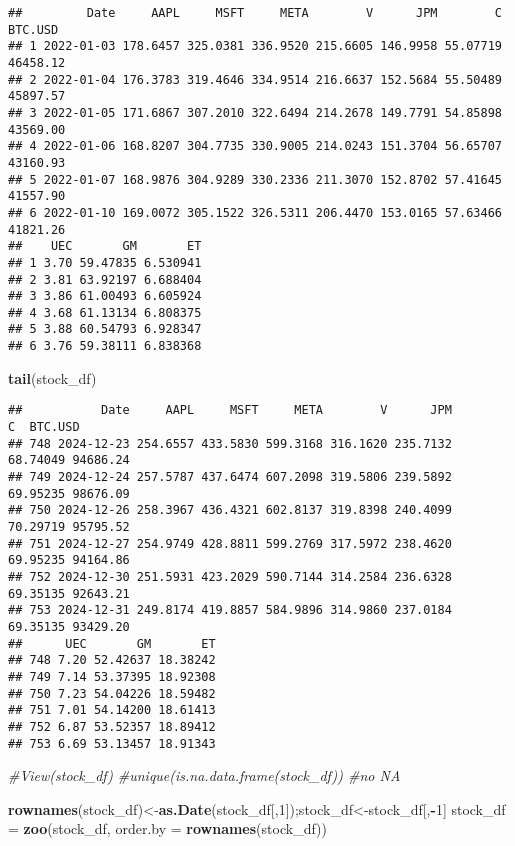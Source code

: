 \documentclass[
]{article}
\newenvironment{Shaded}{\begin{snugshade}}{\end{snugshade}}
\newcommand{\AttributeTok}[1]{\textcolor[rgb]{0.13,0.29,0.53}{#1}}
\newcommand{\CommentTok}[1]{\textcolor[rgb]{0.56,0.35,0.01}{\textit{#1}}}
\newcommand{\DecValTok}[1]{\textcolor[rgb]{0.00,0.00,0.81}{#1}}
\newcommand{\FunctionTok}[1]{\textcolor[rgb]{0.13,0.29,0.53}{\textbf{#1}}}
\newcommand{\NormalTok}[1]{#1}
\newcommand{\OtherTok}[1]{\textcolor[rgb]{0.56,0.35,0.01}{#1}}
\newcommand{\SpecialCharTok}[1]{\textcolor[rgb]{0.81,0.36,0.00}{\textbf{#1}}}
\begin{document}
\begin{verbatim}
##         Date     AAPL     MSFT     META        V      JPM        C  BTC.USD
## 1 2022-01-03 178.6457 325.0381 336.9520 215.6605 146.9958 55.07719 46458.12
## 2 2022-01-04 176.3783 319.4646 334.9514 216.6637 152.5684 55.50489 45897.57
## 3 2022-01-05 171.6867 307.2010 322.6494 214.2678 149.7791 54.85898 43569.00
## 4 2022-01-06 168.8207 304.7735 330.9005 214.0243 151.3704 56.65707 43160.93
## 5 2022-01-07 168.9876 304.9289 330.2336 211.3070 152.8702 57.41645 41557.90
## 6 2022-01-10 169.0072 305.1522 326.5311 206.4470 153.0165 57.63466 41821.26
##    UEC       GM       ET
## 1 3.70 59.47835 6.530941
## 2 3.81 63.92197 6.688404
## 3 3.86 61.00493 6.605924
## 4 3.68 61.13134 6.808375
## 5 3.88 60.54793 6.928347
## 6 3.76 59.38111 6.838368
\end{verbatim}

\begin{Shaded}
\begin{Highlighting}[]
\FunctionTok{tail}\NormalTok{(stock\_df)}
\end{Highlighting}
\end{Shaded}

\begin{verbatim}
##           Date     AAPL     MSFT     META        V      JPM        C  BTC.USD
## 748 2024-12-23 254.6557 433.5830 599.3168 316.1620 235.7132 68.74049 94686.24
## 749 2024-12-24 257.5787 437.6474 607.2098 319.5806 239.5892 69.95235 98676.09
## 750 2024-12-26 258.3967 436.4321 602.8137 319.8398 240.4099 70.29719 95795.52
## 751 2024-12-27 254.9749 428.8811 599.2769 317.5972 238.4620 69.95235 94164.86
## 752 2024-12-30 251.5931 423.2029 590.7144 314.2584 236.6328 69.35135 92643.21
## 753 2024-12-31 249.8174 419.8857 584.9896 314.9860 237.0184 69.35135 93429.20
##      UEC       GM       ET
## 748 7.20 52.42637 18.38242
## 749 7.14 53.37395 18.92308
## 750 7.23 54.04226 18.59482
## 751 7.01 54.14200 18.61413
## 752 6.87 53.52357 18.89412
## 753 6.69 53.13457 18.91343
\end{verbatim}

\begin{Shaded}
\begin{Highlighting}[]
\CommentTok{\#View(stock\_df)}
\CommentTok{\#unique(is.na.data.frame(stock\_df)) \#no NA}

\FunctionTok{rownames}\NormalTok{(stock\_df)}\OtherTok{\textless{}{-}}\FunctionTok{as.Date}\NormalTok{(stock\_df[,}\DecValTok{1}\NormalTok{]);stock\_df}\OtherTok{\textless{}{-}}\NormalTok{stock\_df[,}\SpecialCharTok{{-}}\DecValTok{1}\NormalTok{]}
\NormalTok{stock\_df }\OtherTok{=} \FunctionTok{zoo}\NormalTok{(stock\_df, }\AttributeTok{order.by =} \FunctionTok{rownames}\NormalTok{(stock\_df))}
\end{Highlighting}
\end{Shaded}
\end{document}
